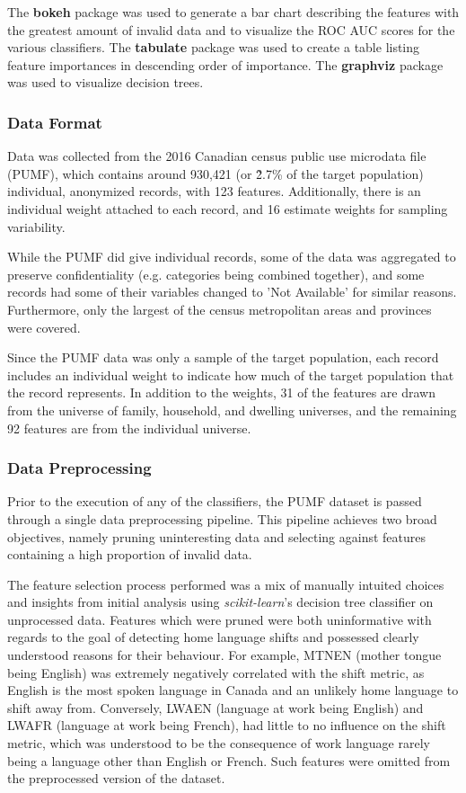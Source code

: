 \documentclass[10pt, conference, compsocconf]{IEEEtran}
\begin{document}
The \textbf{bokeh} package was used to generate a bar chart describing the features with the greatest amount of invalid data and to visualize the ROC AUC scores for the various classifiers. The \textbf{tabulate} package was used to create a table listing feature importances in descending order of importance. The \textbf{graphviz} package was used to visualize decision trees.

\subsubsection{Data Format}
Data was collected from the 2016 Canadian census public use microdata file (PUMF), which contains around 930,421 (or \~2.7\% of the target population) individual, anonymized records, with 123 features. Additionally, there is an individual weight attached to each record, and 16 estimate weights for sampling variability.

While the PUMF did give individual records, some of the data was aggregated to preserve confidentiality (e.g. categories being combined together), and some records had some of their variables changed to 'Not Available' for similar reasons. Furthermore, only the largest of the census metropolitan areas and provinces were covered. 

Since the PUMF data was only a sample of the target population, each record includes an individual weight to indicate how much of the target population that the record represents. In addition to the weights, 31 of the features are drawn from the universe of family, household, and dwelling universes, and the remaining 92 features are from the individual universe.

\subsubsection{Data Preprocessing}
Prior to the execution of any of the classifiers, the PUMF dataset is passed through a single data preprocessing pipeline.  This pipeline achieves two broad objectives, namely pruning uninteresting data and selecting against features containing a high proportion of invalid data.


The feature selection process performed was a mix of manually intuited choices and insights from initial analysis using \textit{scikit-learn}'s decision tree classifier on unprocessed data.  Features which were pruned were both uninformative with regards to the goal of detecting home language shifts and possessed clearly understood reasons for their behaviour.  For example, MTNEN (mother tongue being English) was extremely negatively correlated with the shift metric, as English is the most spoken language in Canada and an unlikely home language to shift away from.  Conversely, LWAEN (language at work being English) and LWAFR (language at work being French), had little to no influence on the shift metric, which was understood to be the consequence of work language rarely being a language other than English or French.  Such features were omitted from the preprocessed version of the dataset.
\end{document}

